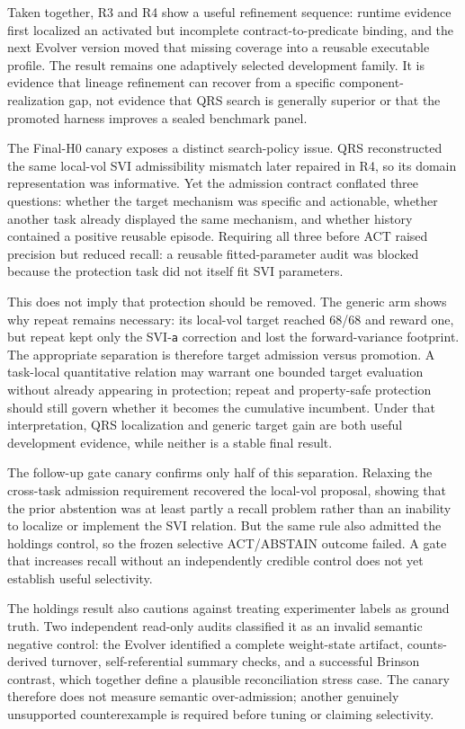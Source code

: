 Taken together, R3 and R4 show a useful refinement sequence: runtime evidence
first localized an activated but incomplete contract-to-predicate binding, and
the next Evolver version moved that missing coverage into a reusable executable
profile. The result remains one adaptively selected development family. It is
evidence that lineage refinement can recover from a specific component-
realization gap, not evidence that QRS search is generally superior or that the
promoted harness improves a sealed benchmark panel.

The Final-H0 canary exposes a distinct search-policy issue. QRS reconstructed
the same local-vol SVI admissibility mismatch later repaired in R4, so its
domain representation was informative. Yet the admission contract conflated
three questions: whether the target mechanism was specific and actionable,
whether another task already displayed the same mechanism, and whether history
contained a positive reusable episode. Requiring all three before ACT raised
precision but reduced recall: a reusable fitted-parameter audit was blocked
because the protection task did not itself fit SVI parameters.

This does not imply that protection should be removed. The generic arm shows
why repeat remains necessary: its local-vol target reached 68/68 and reward one,
but repeat kept only the SVI-\texttt{a} correction and lost the forward-variance
footprint. The appropriate separation is therefore target admission versus
promotion. A task-local quantitative relation may warrant one bounded target
evaluation without already appearing in protection; repeat and property-safe
protection should still govern whether it becomes the cumulative incumbent.
Under that interpretation, QRS localization and generic target gain are both
useful development evidence, while neither is a stable final result.

The follow-up gate canary confirms only half of this separation. Relaxing the
cross-task admission requirement recovered the local-vol proposal, showing that
the prior abstention was at least partly a recall problem rather than an
inability to localize or implement the SVI relation. But the same rule also
admitted the holdings control, so the frozen selective ACT/ABSTAIN outcome
failed. A gate that increases recall without an independently credible control
does not yet establish useful selectivity.

The holdings result also cautions against treating experimenter labels as
ground truth. Two independent read-only audits classified it as an invalid
semantic negative control: the Evolver identified a complete weight-state
artifact, counts-derived turnover, self-referential summary checks, and a
successful Brinson contrast, which together define a plausible reconciliation
stress case. The canary therefore does not measure semantic over-admission;
another genuinely unsupported counterexample is required before tuning or
claiming selectivity.

